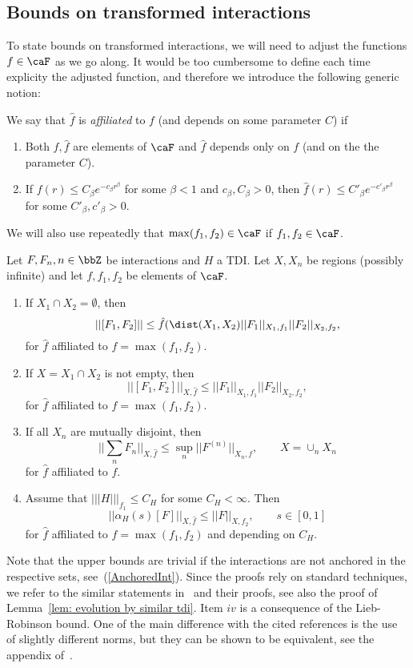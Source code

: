\subsection{Bounds on transformed interactions}\label{sec: bounds on transformed interactions}

To state bounds on transformed interactions, we will need to adjust the functions $f\in\caF$ as we go along.   It would be too cumbersome to define each time explicity the adjusted function, and therefore we introduce the following generic notion:


\begin{definition}\label{def: derived function}
	We say that $\hat{f}$ is \emph{affiliated} to $f$ (and depends on some parameter $C$) if
	\begin{enumerate}
		\item Both $f,\hat{f}$ are elements of $\caF$ and $\hat{f}$ depends only on $f$ (and on the the parameter $C$).  
		\item If $f(r)\leq C_\beta e^{-c_\beta r^\beta}$ for some $\beta<1$ and $c_\beta,C_\beta>0$, then $\hat{f}(r)\leq C'_\beta e^{-c'_\beta r^\beta}$ for some $C'_\beta,c'_\beta>0$.
	\end{enumerate}
\end{definition}
We will also use repeatedly that $\max(f_1,f_2) \in \caF$ if $f_1,f_2 \in\caF$.

\begin{lemma}\label{lem: loc and liebrobinson}
	Let $F,F_{n}, n\in \bbZ$ be interactions and $H$ a TDI. Let $X,X_n$ be regions (possibly infinite) and let $f,f_1,f_2$ be elements of $\caF$. 
	\begin{enumerate}
		\item If   $X_1\cap X_2=\emptyset $, then 
		$$||[F_1,F_2] || \leq  \hat{f}(\dist(X_1,X_2) || F_1||_{X_1,f_1}  || F_2||_{X_2,f_2},    $$
		for $\hat{f}$ affiliated to $f=\max(f_1,f_2)$.
		\item  If $X=X_1\cap X_2 $ is not empty, then 
		$$||[F_1,F_2]||_{X,\hat{f}} \leq   ||F_1 ||_{X_1,f_1}   ||F_2||_{X_2,f_2}, $$
		for $\hat{f}$ affiliated to $f=\max(f_1,f_2)$.
		\item If all $X_n$ are mutually disjoint, then 
		$$||\sum_{n}  F_n||_{X,\hat{f}} \leq \sup_n || F^{(n)}||_{X_n,f},\qquad  X=\cup_n X_n$$
		for $\hat{f}$ affiliated to $f$.
		\item  Assume that $|||H|||_{f_1} \leq C_H $ for some $C_H<\infty$. Then
		$$ ||  \alpha_H(s)[F] ||_{X,\hat{f}} \leq     ||F||_{X,f_2},  \qquad s\in [0,1]
		$$
		for $\hat{f}$ affiliated to $f=\max(f_1,f_2)$ and depending on $C_H$.
	\end{enumerate}
\end{lemma}
Note that the upper bounds are trivial if the interactions are not anchored in the respective sets, see~(\ref{AnchoredInt}). Since the proofs rely on standard techniques, we refer to the similar statements in~\cite{nachtergaele2019quasi,bachmann2022trotter} and their proofs, see also the proof of Lemma~\ref{lem: evolution by similar tdi}. Item $iv$ is a consequence of the Lieb-Robinson bound. One of the main difference with the cited references is the use of slightly different norms, but they can be shown to be equivalent, see the appendix of~\cite{Stability}.


